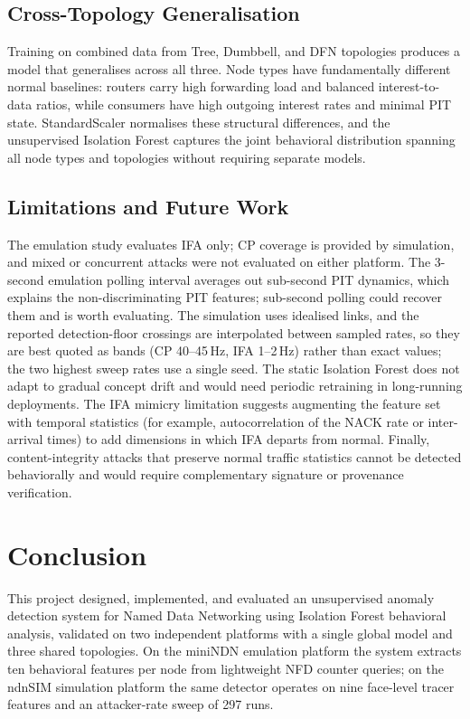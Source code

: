 \documentclass[12pt]{report}
\begin{document}
\section{Cross-Topology Generalisation}

Training on combined data from Tree, Dumbbell, and DFN topologies produces a model that generalises across all three. Node types have fundamentally different normal baselines: routers carry high forwarding load and balanced interest-to-data ratios, while consumers have high outgoing interest rates and minimal PIT state. StandardScaler normalises these structural differences, and the unsupervised Isolation Forest captures the joint behavioral distribution spanning all node types and topologies without requiring separate models.

\section{Limitations and Future Work}

The emulation study evaluates IFA only; CP coverage is provided by simulation, and mixed or concurrent attacks were not evaluated on either platform. The 3-second emulation polling interval averages out sub-second PIT dynamics, which explains the non-discriminating PIT features; sub-second polling could recover them and is worth evaluating. The simulation uses idealised links, and the reported detection-floor crossings are interpolated between sampled rates, so they are best quoted as bands (CP 40--45\,Hz, IFA 1--2\,Hz) rather than exact values; the two highest sweep rates use a single seed. The static Isolation Forest does not adapt to gradual concept drift and would need periodic retraining in long-running deployments. The IFA mimicry limitation suggests augmenting the feature set with temporal statistics (for example, autocorrelation of the NACK rate or inter-arrival times) to add dimensions in which IFA departs from normal. Finally, content-integrity attacks that preserve normal traffic statistics cannot be detected behaviorally and would require complementary signature or provenance verification.

\chapter{Conclusion}

This project designed, implemented, and evaluated an unsupervised anomaly detection system for Named Data Networking using Isolation Forest behavioral analysis, validated on two independent platforms with a single global model and three shared topologies. On the miniNDN emulation platform the system extracts ten behavioral features per node from lightweight NFD counter queries; on the ndnSIM simulation platform the same detector operates on nine face-level tracer features and an attacker-rate sweep of 297 runs.
\end{document}
